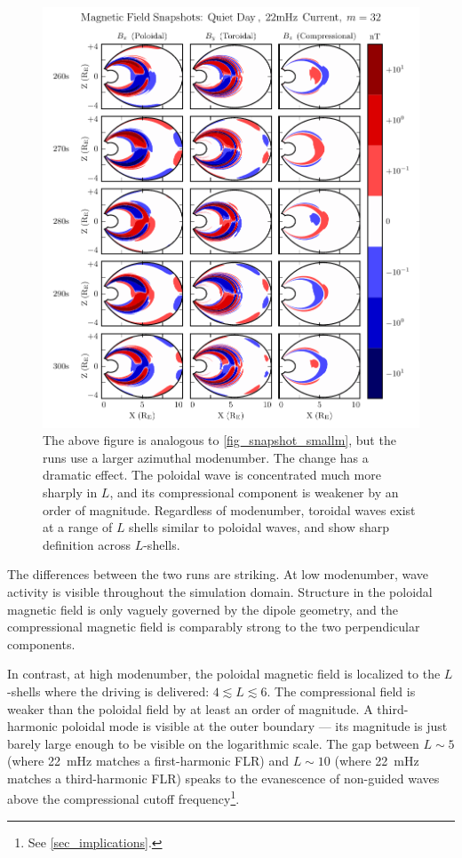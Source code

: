 \begin{figure}[!htb]
    \centering
    \includegraphics[width=\textwidth]{figures/snapshot_bigm.pdf}
    \caption[Magnetic Field Snapshots from a Large-\azm Run]{
      The above figure is analogous to \cref{fig_snapshot_smallm}, but the runs use a larger azimuthal modenumber. The change has a dramatic effect. The poloidal wave is concentrated much more sharply in $L$, and its compressional component is weakener by an order of magnitude. Regardless of modenumber, toroidal waves exist at a range of $L$ shells similar to poloidal waves, and show sharp definition across $L$-shells. 
    }
    \label{fig_snapshot_bigm}
\end{figure}

The differences between the two runs are striking. At low modenumber, wave activity is visible throughout the simulation domain. Structure in the poloidal magnetic field is only vaguely governed by the dipole geometry, and the compressional magnetic field is comparably strong to the two perpendicular components. 

In contrast, at high modenumber, the poloidal magnetic field is localized to the $L$-shells where the driving is delivered: $4 \lesssim L \lesssim 6$. The compressional field is weaker than the poloidal field by at least an order of magnitude. A third-harmonic poloidal mode is visible at the outer boundary --- its magnitude is just barely large enough to be visible on the logarithmic scale. The gap between $L\sim5$ (where \SI{22}{\mHz} matches a first-harmonic FLR) and $L\sim10$ (where \SI{22}{\mHz} matches a third-harmonic FLR) speaks to the evanescence of non-guided waves above the compressional \Alfven cutoff frequency\footnote{See \cref{sec_implications}. }. 

